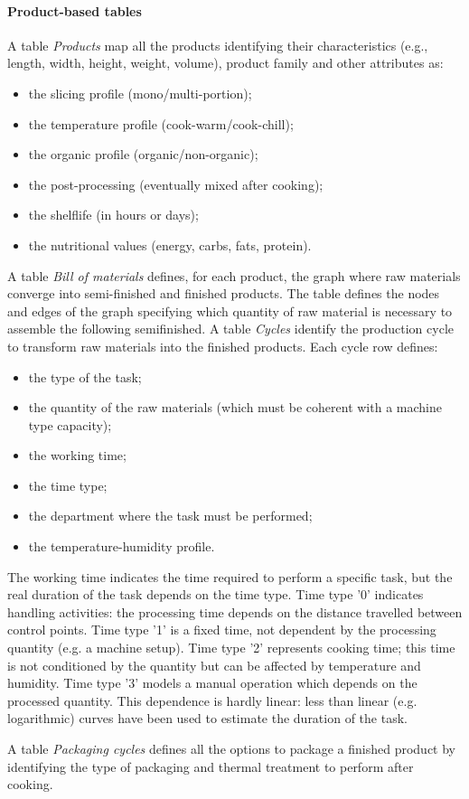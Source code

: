 \paragraph{Product-based tables}
A table \textit{Products} map all the products identifying their characteristics (e.g., length, width, height, weight, volume), product family and other attributes as:

\begin{itemize}
    \item the slicing profile (mono/multi-portion);
    \item the temperature profile (cook-warm/cook-chill);
    \item the organic profile (organic/non-organic);
    \item the post-processing (eventually mixed after cooking);
    \item the shelflife (in hours or days);
    \item the nutritional values (energy, carbs, fats, protein). 

\end{itemize}

A table \textit{Bill of materials} defines, for each product, the graph where raw materials converge into semi-finished and finished products. The table defines the nodes and edges of the graph specifying which quantity of raw material is necessary to assemble the following semifinished. A table \textit{Cycles} identify the production cycle to transform raw materials into the finished products. Each cycle row defines:

\begin{itemize}
    \item the type of the task;
    \item the quantity of the raw materials (which must be coherent with a machine type capacity);
    \item the working time;
    \item the time type;
    \item the department where the task must be performed;
    \item the temperature-humidity profile.  
\end{itemize}

The working time indicates the time required to perform a specific task, but the real duration of the task depends on the time type. Time type '0' indicates handling activities: the processing time depends on the distance travelled between control points. Time type '1' is a fixed time, not dependent by the processing quantity (e.g. a machine setup). Time type '2' represents cooking time; this time is not conditioned by the quantity but can be affected by temperature and humidity. Time type '3' models a manual operation which depends on the processed quantity. This dependence is hardly linear: less than linear (e.g. logarithmic) curves have been used to estimate the duration of the task. \par
A table \textit{Packaging cycles} defines all the options to package a finished product by identifying the type of packaging and thermal treatment to perform after cooking.

